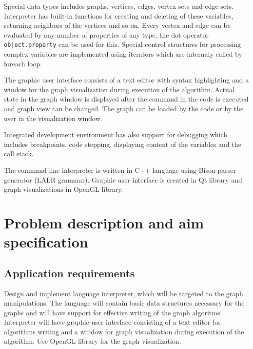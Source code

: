 \documentclass[11pt,twoside,a4paper]{book}
\begin{document}
Special data types includes graphs, vertices, edges, vertex sets and edge sets. Interpreter has built-in functions for creating and deleting of these variables, returning neighbors of the vertices and so on. Every vertex and edge can be evaluated by any number of properties of any type, the dot operator \texttt{object.property} can be used for this. Special control structures for processing complex variables are implemented using iterators which are internaly called by foreach loop.

The graphic user interface consists of a text editor with syntax highlighting and a window for the graph visualization during execution of the algorithm. Actual state in the graph window is displayed after the command in the code is executed and graph view can be changed. The graph can be loaded by the code or by the user in the visualization window.

Integrated development environment has also support for debugging which includes breakpoints, code stepping, displaying content of the variables and the call stack.

The command line interpreter is written in C++ language using Bison parser generator (LALR grammar). Graphic user interface is created in Qt library and graph visualizations in OpenGL library.



\chapter{Problem description and aim specification}



\section{Application requirements}

Design and implement language interpreter, which will be targeted to the graph manipulations. The language will contain basic data structures necessary for the graphs and will have support for effective writing of the graph algoritms. Interpreter will have graphic user interface consisting of a text editor for algorithms writing and a window for graph visualization during execution of the algorithm. Use OpenGL library for the graph visualization.
\end{document}
